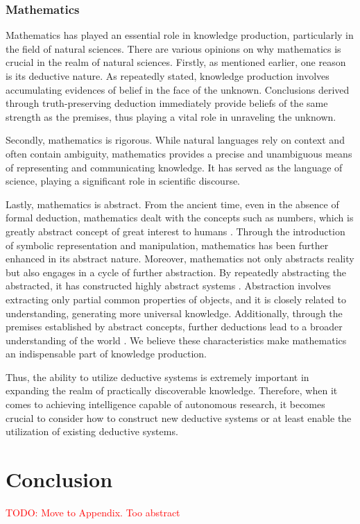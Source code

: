 \documentclass{book}
\begin{document}
\subsubsection{Mathematics}
Mathematics has played an essential role in knowledge production, particularly in the field of natural sciences. There are various opinions on why mathematics is crucial in the realm of natural sciences. Firstly, as mentioned earlier, one reason is its deductive nature. As repeatedly stated, knowledge production involves accumulating evidences of belief in the face of the unknown. Conclusions derived through truth-preserving deduction immediately provide beliefs of the same strength as the premises, thus playing a vital role in unraveling the unknown. 

Secondly, mathematics is rigorous. While natural languages rely on context and often contain ambiguity, mathematics provides a precise and unambiguous means of representing and communicating knowledge. It has served as the language of science, playing a significant role in scientific discourse.

Lastly, mathematics is abstract. From the ancient time, even in the absence of formal deduction, mathematics dealt with the concepts such as numbers, which is greatly abstract concept of great interest to humans \cite{david2010history}. Through the introduction of symbolic representation and manipulation, mathematics has been further enhanced in its abstract nature. Moreover, mathematics not only abstracts reality but also engages in a cycle of further abstraction. By repeatedly abstracting the abstracted, it has constructed highly abstract systems \cite{bochner1966role}. Abstraction involves extracting only partial common properties of objects, and it is closely related to understanding, generating more universal knowledge. Additionally, through the premises established by abstract concepts, further deductions lead to a broader understanding of the world \cite{heisenberg2008abstraction}. We believe these characteristics make mathematics an indispensable part of knowledge production. 

Thus, the ability to utilize deductive systems is extremely important in expanding the realm of practically discoverable knowledge. Therefore, when it comes to achieving intelligence capable of autonomous research, it becomes crucial to consider how to construct new deductive systems or at least enable the utilization of existing deductive systems.

\section{Conclusion}
\textcolor{red}{TODO: Move to Appendix. Too abstract}
\end{document}
